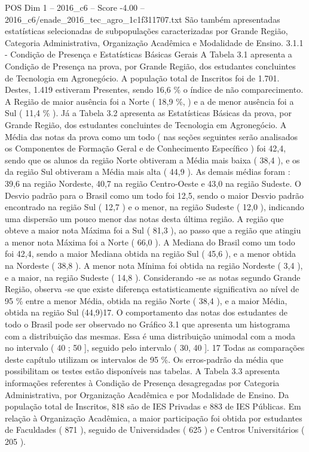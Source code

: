 \begin{textsample}{POS Dim 1 – 2016\_c6 – Score -4.00 – 2016\_c6/enade\_2016\_tec\_agro\_1c1f311707.txt}
São também apresentadas estatísticas selecionadas de subpopulações caracterizadas por Grande Região, Categoria Administrativa, Organização Acadêmica e Modalidade de Ensino. 3.1.1 - Condição de Presença e Estatísticas Básicas Gerais A Tabela 3.1 apresenta a Condição de Presença na prova, por Grande Região, dos estudantes concluintes de Tecnologia em Agronegócio.
A população total de Inscritos foi de 1.701.
Destes, 1.419 estiveram Presentes, sendo 16,6 \% o índice de não comparecimento.
A Região de maior ausência foi a Norte ( 18,9 \%, ) e a de menor ausência foi a Sul ( 11,4 \% ).
Já a Tabela 3.2 apresenta as Estatísticas Básicas da prova, por Grande Região, dos estudantes concluintes de Tecnologia em Agronegócio.
A Média das notas da prova como um todo ( nas seções seguintes serão analisados os Componentes de Formação Geral e de Conhecimento Específico ) foi 42,4, sendo que os alunos da região Norte obtiveram a Média mais baixa ( 38,4 ), e os da região Sul obtiveram a Média mais alta ( 44,9 ).
As demais médias foram : 39,6 na região Nordeste, 40,7 na região Centro-Oeste e 43,0 na região Sudeste.
O Desvio padrão para o Brasil como um todo foi 12,5, sendo o maior Desvio padrão encontrado na região Sul ( 12,7 ) e o menor, na região Sudeste ( 12,0 ), indicando uma dispersão um pouco menor das notas desta última região.
A região que obteve a maior nota Máxima foi a Sul ( 81,3 ), ao passo que a região que atingiu a menor nota Máxima foi a Norte ( 66,0 ).
A Mediana do Brasil como um todo foi 42,4, sendo a maior Mediana obtida na região Sul ( 45,6 ), e a menor obtida na Nordeste ( 38,8 ).
A menor nota Mínima foi obtida na região Nordeste ( 3,4 ), e a maior, na região Sudeste ( 14,8 ).
Considerando -se as notas segundo Grande Região, observa -se que existe diferença estatisticamente significativa ao nível de 95 \% entre a menor Média, obtida na região Norte ( 38,4 ), e a maior Média, obtida na região Sul (44,9)17.
O comportamento das notas dos estudantes de todo o Brasil pode ser observado no Gráfico 3.1 que apresenta um histograma com a distribuição das mesmas.
Essa é uma distribuição unimodal com a moda no intervalo ( 40 ; 50 ], seguido pelo intervalo ( 30, 40 ]. 17 Todas as comparações deste capítulo utilizam os intervalos de 95 \%.
Os erros-padrão da média que possibilitam os testes estão disponíveis nas tabelas.
A Tabela 3.3 apresenta informações referentes à Condição de Presença desagregadas por Categoria Administrativa, por Organização Acadêmica e por Modalidade de Ensino.
Da população total de Inscritos, 818 são de IES Privadas e 883 de IES Públicas.
Em relação à Organização Acadêmica, a maior participação foi obtida por estudantes de Faculdades ( 871 ), seguido de Universidades ( 625 ) e Centros Universitários ( 205 ).

\end{textsample}
